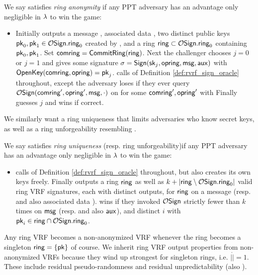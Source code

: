\begin{definition}
We say \rVRF satisfies {\em ring anonymity} if
any PPT adversary \adv has an advantage only
 negligible in $\lambda$ to win the game:
\begin{itemize}
\item[]
 Initially \adv outputs a message \msg, associated data \aux,
 two distinct public keys $\mathsf{pk}_0,\mathsf{pk}_1 \in \mathcal{O}\mathsf{Sign}.\mathsf{ring}_0$ created by ,
 and a ring $\mathsf{ring} \subset \mathcal{O}\mathsf{Sign}.\mathsf{ring}_0$ containing $\mathsf{pk}_0,\mathsf{pk}_1$.
 Set $\mathsf{comring} = {\mathsf{CommitRing}}(\mathsf{ring})$.
 Next the challenger chooses $j=0$ or $j=1$ and gives
  \adv some signature $\sigma = {\mathsf{Sign}}(\mathsf{sk}_j,\mathsf{opring},\mathsf{msg},\mathsf{aux})$ with ${\mathsf{OpenKey}}(\mathsf{comring},\mathsf{opring}) = \mathsf{pk}_j$.
 \adv calls  of Definition \ref{def:rvrf_sign_oracle} throughout,
 except the adversary \adv loses if they ever query $\mathcal{O}\mathsf{Sign}(\mathsf{comring}',\mathsf{opring}',\mathsf{msg},\cdot)$
 on \msg for some $\mathsf{comring}',\mathsf{opring}'$ with
 \def\tmp{\OpenKey(\comring',\openring') \in \{ \pk_0, \pk_1 \}}
 \eprint{$\tmp$.}{$$ \mathperiod $$}
 Finally \adv guesses $j$ and wins if correct.
\end{itemize}
\end{definition}

We similarly want a ring uniqueness that limits adversaries who know secret keys,
as well as a ring unforgeability resembling \cite[pp. 7 Def. 7]{cryptoeprint:2005:304}. %

\begin{definition}
We say \rVRF satisfies {\em ring uniqueness} (resp. ring unforgeability)if
any PPT adversary \adv has an advantage only
 negligible in $\lambda$ to win the game:
\begin{itemize}
\item[]
 \adv calls  of Definition \ref{def:rvrf_sign_oracle} throughout,
 but also creates its own keys freely.
 Finally \adv outputs a ring $\mathsf{ring}$ as well as
 $k + |\mathsf{ring} \setminus \mathcal{O}\mathsf{Sign}.\mathsf{ring}_0|$ valid ring VRF signatures,
  each with distinct outputs,    %
 for $\mathsf{ring}$ on a message \msg (resp. and also associated data \aux).
 \adv wins if they invoked $\mathcal{O}\mathsf{Sign}$ strictly fewer than $k$ times
 on $\mathsf{msg}$ (resp. and also $\mathsf{aux}$), and
  distinct $i$ with $\mathsf{pk}_i \in \mathsf{ring} \cap \mathcal{O}\mathsf{Sign}.\mathsf{ring}_0$.
\end{itemize}
\end{definition}
 
Any ring VRF becomes a non-anonymized VRF whenever
 the ring becomes a singleton $\mathsf{ring} = \{ \mathsf{pk} \}$ of course.
We inherit ring VRF output properties from non-anonymized VRFs
because they wind up strongest for singleton rings, i.e. $|\ring| = 1$.
These include 
 residual pseudo-randomness \cite[Def. VRF (3) \S3.2, pp. 4]{vrf_micali} and
 residual unpredictability \cite[Def. VUF (3) \S3.2, pp. 5]{vrf_micali}
  (also \cite[Def. 4, pp. 8]{agg_dkg}).





